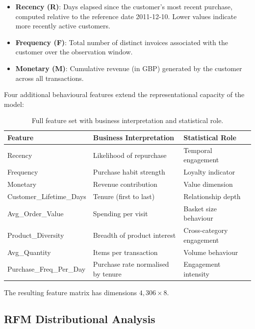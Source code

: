 \documentclass[12pt,a4paper]{article}
\begin{document}
\begin{itemize}[leftmargin=*]
  \item \textbf{Recency (R)}: Days elapsed since the customer's most recent purchase,
        computed relative to the reference date 2011-12-10.  Lower values indicate more
        recently active customers.
  \item \textbf{Frequency (F)}: Total number of distinct invoices associated with the
        customer over the observation window.
  \item \textbf{Monetary (M)}: Cumulative revenue (in GBP) generated by the customer
        across all transactions.
\end{itemize}

Four additional behavioural features extend the representational capacity of the model:

\begin{table}[H]
  \centering
  \caption{Full feature set with business interpretation and statistical role.}
  \label{tab:features}
  \begin{tabular}{p{4.2cm}p{4.8cm}p{4.8cm}}
    \toprule
    \textbf{Feature} & \textbf{Business Interpretation} & \textbf{Statistical Role} \\
    \midrule
    Recency              & Likelihood of repurchase      & Temporal engagement \\
    Frequency            & Purchase habit strength       & Loyalty indicator \\
    Monetary             & Revenue contribution          & Value dimension \\
    Customer\_Lifetime\_Days & Tenure (first to last)   & Relationship depth \\
    Avg\_Order\_Value    & Spending per visit            & Basket size behaviour \\
    Product\_Diversity   & Breadth of product interest   & Cross-category engagement \\
    Avg\_Quantity        & Items per transaction         & Volume behaviour \\
    Purchase\_Freq\_Per\_Day & Purchase rate normalised by tenure & Engagement intensity \\
    \bottomrule
  \end{tabular}
\end{table}

The resulting feature matrix has dimensions $4{,}306 \times 8$.

\subsection{RFM Distributional Analysis}
\end{document}

